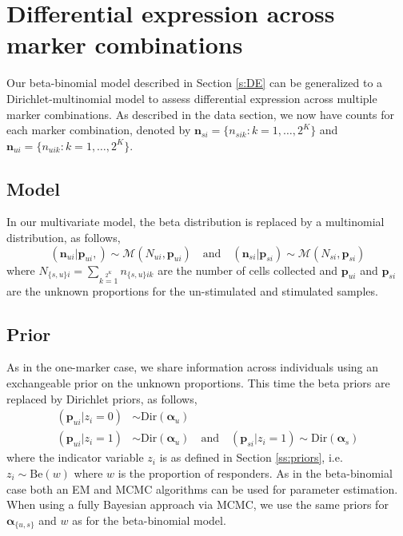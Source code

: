 \documentclass[useAMS,referee,usenatbib]{biom}
\begin{document}
\section{Differential expression across marker combinations}
\label{s:demarkercombos}
Our beta-binomial model described in Section \ref{s:DE} can be generalized to a Dirichlet-multinomial model to assess differential expression across multiple marker combinations. As described in the data section, we now have counts for each marker combination, denoted by  $\mathbf{n}_{si}=\{n_{sik}: k=1,\dots,2^K\}$ and $\mathbf{n}_{ui}=\{n_{uik}: k=1,\dots,2^K\}$.
\subsection{Model}

In our multivariate model, the beta distribution is replaced by a multinomial distribution, as follows,
\begin{equation*}
 (\mathbf{n}_{ui}|\mathbf{p}_{ui},) \sim \mathcal{M}(N_{ui},\mathbf{p}_{ui})\quad\text{and}\quad (\mathbf{n}_{si}|\mathbf{p}_{si}) \sim \mathcal{M}(N_{si},\mathbf{p}_{si})\label{eq:mult_likeliehood}
 \end{equation*}
where $N_{\{s,u\}i}=\sum\limits_{k=1}\limits^{2^K} n_{\{s,u\}ik}$ are the number of cells collected and $\mathbf{p}_{ui}$ and $\mathbf{p}_{si}$ are the unknown proportions for the un-stimulated and stimulated samples.

\subsection{Prior}
As in the one-marker case, we share information across individuals using an exchangeable prior on the unknown proportions. This time the beta priors are replaced by Dirichlet priors, as follows,
\begin{align*}
(\mathbf{p}_{ui}|z_i=0) &\sim \mathrm{Dir}(\boldsymbol{\alpha}_u)\\\nonumber
(\mathbf{p}_{ui}|z_i=1) &\sim \mathrm{Dir}(\boldsymbol{\alpha}_u) \quad \text{and}\quad (\mathbf{p}_{si}|z_i=1) \sim \mathrm{Dir}(\boldsymbol{\alpha}_s)%
\end{align*}
where the indicator variable $z_i$ is as defined in Section \ref{ss:priors}, i.e. $z_i\sim\mathrm{Be}(w)$ where $w$ is the proportion of responders. As in the beta-binomial case both an EM and MCMC algorithms can be used for parameter estimation. When using a fully Bayesian approach via MCMC, we use the same priors for $\boldsymbol{\alpha}_{\{u,s\}}$ and $w$ as for the beta-binomial model. 
\end{document}
